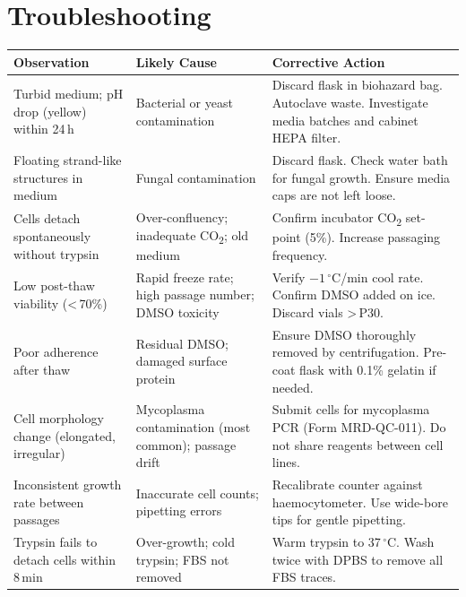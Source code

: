
\section{Troubleshooting}

\renewcommand{\arraystretch}{1.35}
\begin{tabularx}{\linewidth}{L{3.8cm} L{4.5cm} X}
\toprule
{}
\textbf{Observation} & \textbf{Likely Cause} & \textbf{Corrective Action} \\
\midrule
Turbid medium; pH drop (yellow) within 24\,h &
  Bacterial or yeast contamination &
  Discard flask in biohazard bag. Autoclave waste. Investigate media batches and cabinet HEPA filter. \\
Floating strand-like structures in medium &
  Fungal contamination &
  Discard flask. Check water bath for fungal growth. Ensure media caps are not left loose. \\
Cells detach spontaneously without trypsin &
  Over-confluency; inadequate CO\textsubscript{2}; old medium &
  Confirm incubator CO\textsubscript{2} set-point (5\%). Increase passaging frequency. \\
Low post-thaw viability (\textless\,70\%) &
  Rapid freeze rate; high passage number; DMSO toxicity &
  Verify $-1\,^\circ$C/min cool rate. Confirm DMSO added on ice. Discard vials \textgreater\,P30. \\
Poor adherence after thaw &
  Residual DMSO; damaged surface protein &
  Ensure DMSO thoroughly removed by centrifugation. Pre-coat flask with 0.1\% gelatin if needed. \\
Cell morphology change (elongated, irregular) &
  Mycoplasma contamination (most common); passage drift &
  Submit cells for mycoplasma PCR (Form MRD-QC-011). Do not share reagents between cell lines. \\
Inconsistent growth rate between passages &
  Inaccurate cell counts; pipetting errors &
  Recalibrate counter against haemocytometer. Use wide-bore tips for gentle pipetting. \\
Trypsin fails to detach cells within 8\,min &
  Over-growth; cold trypsin; FBS not removed &
  Warm trypsin to 37\,$^\circ$C. Wash twice with DPBS to remove all FBS traces. \\
\bottomrule
\end{tabularx}

